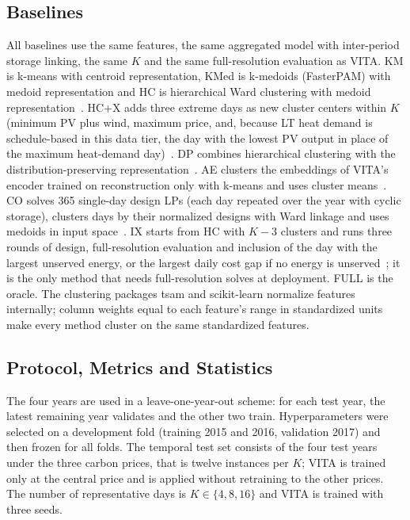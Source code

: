 \documentclass[journal]{IEEEtran}
\begin{document}


\subsection{Baselines}
All baselines use the same features, the same aggregated model with inter-period storage linking, the same $K$ and the same full-resolution evaluation as VITA. KM is k-means with centroid representation, KMed is k-medoids (FasterPAM) with medoid representation and HC is hierarchical Ward clustering with medoid representation~\cite{kotzur2018impact,teichgraeber2019clustering}. HC+X adds three extreme days as new cluster centers within $K$ (minimum PV plus wind, maximum price, and, because LT heat demand is schedule-based in this data tier, the day with the lowest PV output in place of the maximum heat-demand day)~\cite{kotzur2018impact,teichgraeber2021iterative}. DP combines hierarchical clustering with the distribution-preserving representation~\cite{hoffmann2022pareto}. AE clusters the embeddings of VITA's encoder trained on reconstruction only with k-means and uses cluster means~\cite{barbar2022autoencoder}. CO solves 365 single-day design LPs (each day repeated over the year with cyclic storage), clusters days by their normalized designs with Ward linkage and uses medoids in input space~\cite{sun2019costoriented}. IX starts from HC with $K-3$ clusters and runs three rounds of design, full-resolution evaluation and inclusion of the day with the largest unserved energy, or the largest daily cost gap if no energy is unserved~\cite{teichgraeber2021iterative}; it is the only method that needs full-resolution solves at deployment. FULL is the oracle. The clustering packages tsam and scikit-learn normalize features internally; column weights equal to each feature's range in standardized units make every method cluster on the same standardized features.

\subsection{Protocol, Metrics and Statistics}
The four years are used in a leave-one-year-out scheme: for each test year, the latest remaining year validates and the other two train. Hyperparameters were selected on a development fold (training 2015 and 2016, validation 2017) and then frozen for all folds. The temporal test set consists of the four test years under the three carbon prices, that is twelve instances per $K$; VITA is trained only at the central price and is applied without retraining to the other prices. The number of representative days is $K\in\{4,8,16\}$ and VITA is trained with three seeds.
\end{document}

